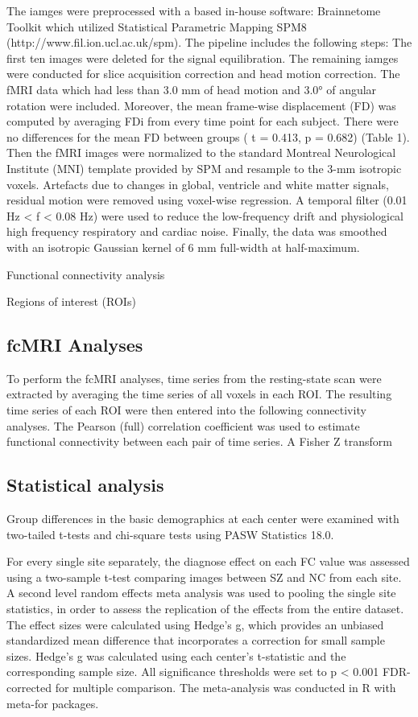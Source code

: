 \documentclass[preprint,authoryear,review,12pt]{elsarticle}
\begin{document}
The iamges were preprocessed with a based in-house software: Brainnetome Toolkit which utilized Statistical Parametric Mapping SPM8 (http://www.fil.ion.ucl.ac.uk/spm). The pipeline includes the following steps: The first ten images were deleted for the signal equilibration. The remaining iamges were conducted for slice acquisition correction and head motion correction.  The fMRI data which had
less than 3.0 mm of head motion and 3.0° of angular rotation were included.  Moreover, the mean frame-wise displacement (FD) was computed by averaging FDi from every time point for each subject. There were no differences for the mean FD between groups
( t = 0.413, p = 0.682) (Table 1). Then the fMRI images were normalized to the standard Montreal Neurological Institute (MNI) template provided by SPM and resample to the 3-mm isotropic voxels. Artefacts due to changes in global, ventricle and white matter signals, residual motion were removed using voxel-wise regression. A temporal filter (0.01 Hz < f < 0.08 Hz) were used to reduce the low-frequency drift and physiological high frequency respiratory and cardiac noise.  Finally, the data was smoothed with an isotropic Gaussian kernel of 6 mm full-width at half-maximum. 

Functional connectivity analysis

Regions of interest (ROIs)

\subsection*{fcMRI Analyses}

To perform the fcMRI analyses, time series from the resting-state scan were extracted by averaging the time series of all voxels in each ROI. The resulting time series of each ROI were then entered into the following connectivity analyses.
The Pearson (full) correlation coefficient was used to estimate functional connectivity between each pair of time series. A Fisher Z transform  

\subsection*{Statistical analysis}

Group differences in the basic demographics at each center were examined with two-tailed t-tests and chi-square tests using PASW Statistics 18.0.

For every single site separately, the diagnose effect on each FC value was assessed using a two-sample t-test comparing images between SZ and NC from each site. A second level random effects meta analysis was used to pooling the single site statistics, in order to assess the replication of the effects from the entire dataset. The effect sizes were calculated using Hedge’s g, which provides an unbiased standardized mean difference that incorporates a correction for small sample sizes. Hedge’s g was calculated using each center’s t-statistic and the corresponding sample size. All significance thresholds were set to p < 0.001 FDR-corrected for multiple comparison. The meta-analysis was conducted in R with meta-for packages.
\end{document}
